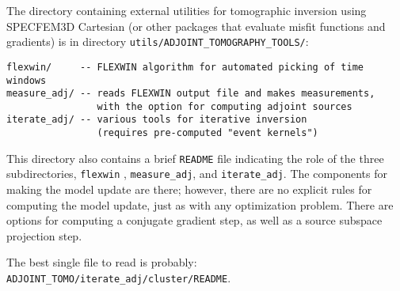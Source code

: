 The directory containing external utilities for tomographic inversion using
SPECFEM3D Cartesian (or other packages that evaluate misfit functions
and gradients) is in directory \texttt{utils/ADJOINT\_TOMOGRAPHY\_TOOLS/}:
\begin{verbatim}
flexwin/     -- FLEXWIN algorithm for automated picking of time windows
measure_adj/ -- reads FLEXWIN output file and makes measurements,
                with the option for computing adjoint sources
iterate_adj/ -- various tools for iterative inversion
                (requires pre-computed "event kernels")
\end{verbatim}
This directory also contains
a brief \verb+README+ file indicating the role of the three subdirectories,
\verb+flexwin+ \citep{Maggi2009}, \verb+measure_adj+, and \verb+iterate_adj+.
The components for making the model update are there; however, there
are no explicit rules for computing the model update, just as with
any optimization problem. There are options for computing a conjugate
gradient step, as well as a source subspace projection step.

The best single file to read is probably: \verb+ADJOINT_TOMO/iterate_adj/cluster/README+.



